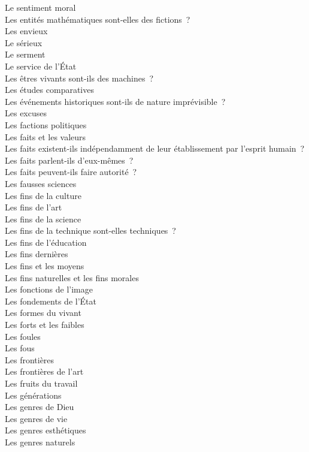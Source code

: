 \documentclass[a4paper,12pt]{article}
\begin{document}
Le sentiment moral \\
Les entités mathématiques sont-elles des fictions ? \\
Les envieux \\
Le sérieux \\
Le serment \\
Le service de l'État \\
Les êtres vivants sont-ils des machines ? \\
Les études comparatives \\
Les événements historiques sont-ils de nature imprévisible ? \\
Les excuses \\
Les factions politiques \\
Les faits et les valeurs \\
Les faits existent-ils indépendamment de leur établissement par l'esprit humain ? \\
Les faits parlent-ils d'eux-mêmes ? \\
Les faits peuvent-ils faire autorité ? \\
Les fausses sciences \\
Les fins de la culture \\
Les fins de l'art \\
Les fins de la science \\
Les fins de la technique sont-elles techniques ? \\
Les fins de l'éducation \\
Les fins dernières \\
Les fins et les moyens \\
Les fins naturelles et les fins morales \\
Les fonctions de l'image \\
Les fondements de l'État \\
Les formes du vivant \\
Les forts et les faibles \\
Les foules \\
Les fous \\
Les frontières \\
Les frontières de l'art \\
Les fruits du travail \\
Les générations \\
Les genres de Dieu \\
Les genres de vie \\
Les genres esthétiques \\
Les genres naturels \\
\end{document}
